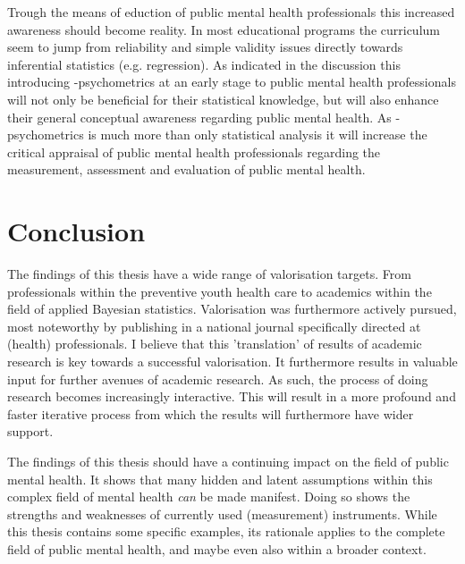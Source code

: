 Trough the means of eduction of public mental health professionals this increased awareness should become reality. In most educational programs the curriculum seem to jump from reliability and simple validity issues directly towards inferential statistics (e.g. regression). As indicated in the discussion this introducing \textbeta-psychometrics at an early stage to public mental health professionals will not only be beneficial for their statistical knowledge, but will also enhance their general conceptual awareness regarding public mental health. As \textbeta-psychometrics is much more than only statistical analysis it will increase the critical appraisal of public mental health professionals regarding the measurement, assessment and evaluation of public mental health. 

\section*{Conclusion}
The findings of this thesis have a wide range of valorisation targets. From professionals within the preventive youth health care to academics within the field of applied Bayesian statistics. Valorisation was furthermore actively pursued, most noteworthy by publishing in a national journal specifically directed at (health) professionals. I believe that this 'translation' of results of academic research is key towards a successful valorisation. It furthermore results in valuable input for further avenues of academic research. As such, the process of doing research becomes increasingly interactive. This will result in a more profound and faster iterative process from which the results will furthermore have wider support.

The findings of this thesis should have a continuing impact on the field of public mental health. It shows that many hidden and latent assumptions within this complex field of mental health \textit{can} be made manifest. Doing so shows the strengths and weaknesses of currently used (measurement) instruments. While this thesis contains some specific examples, its rationale applies to the complete field of public mental health, and maybe even also within a broader context.